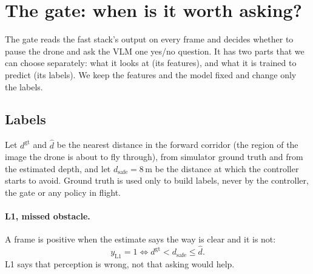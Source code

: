 \providecommand{\todo}[1]{\textbf{[TODO: #1]}}

\section{The gate: when is it worth asking?}
\label{sec:gate}

The gate reads the fast stack's output on every frame and decides whether to pause the drone and ask the VLM one
yes/no question. It has two parts that we can choose separately: what it looks at (its features), and what it is
trained to predict (its labels). We keep the features and the model fixed and change only the labels.

\subsection{Labels}
\label{sec:gate-labels}

Let $d^{\mathrm{gt}}$ and $\hat d$ be the nearest distance in the forward corridor (the region of the image the
drone is about to fly through), from simulator ground truth and from the estimated depth, and let
$d_{\mathrm{safe}} = 8$\,m be the distance at which the controller starts to avoid. Ground truth is used only to
build labels, never by the controller, the gate or any policy in flight.

\paragraph{L1, missed obstacle.} A frame is positive when the estimate says the way is clear and it is not:
\[
  y_{\mathrm{L1}} = 1 \iff d^{\mathrm{gt}} < d_{\mathrm{safe}} \le \hat d .
\]
L1 says that perception is wrong, not that asking would help.

